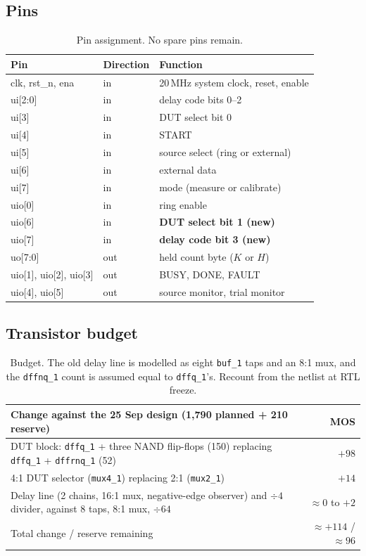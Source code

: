 \documentclass[11pt]{article}
\begin{document}
\subsection{Pins}
\begin{table}[H]
\centering\small
\begin{tabular}{@{}lll@{}}
\toprule
Pin & Direction & Function \\
\midrule
clk, rst\_n, ena & in & 20\,MHz system clock, reset, enable \\
ui[2:0] & in & delay code bits 0--2 \\
ui[3] & in & DUT select bit 0 \\
ui[4] & in & START \\
ui[5] & in & source select (ring or external) \\
ui[6] & in & external data \\
ui[7] & in & mode (measure or calibrate) \\
uio[0] & in & ring enable \\
uio[6] & in & \textbf{DUT select bit 1 (new)} \\
uio[7] & in & \textbf{delay code bit 3 (new)} \\
uo[7:0] & out & held count byte ($K$ or $H$) \\
uio[1], uio[2], uio[3] & out & BUSY, DONE, FAULT \\
uio[4], uio[5] & out & source monitor, trial monitor \\
\bottomrule
\end{tabular}
\caption{Pin assignment. No spare pins remain.}
\end{table}

\subsection{Transistor budget}
\begin{table}[H]
\centering\small
\begin{tabularx}{\linewidth}{@{}Xr@{}}
\toprule
Change against the 25 Sep design (1{,}790 planned + 210 reserve) & MOS \\
\midrule
DUT block: \texttt{dffq\_1} + three NAND flip-flops (150) replacing \texttt{dffq\_1} + \texttt{dffrnq\_1} (52) & $+98$ \\
4:1 DUT selector (\texttt{mux4\_1}) replacing 2:1 (\texttt{mux2\_1}) & $+14$ \\
Delay line (2 chains, 16:1 mux, negative-edge observer) and $\div4$ divider, against 8 taps, 8:1 mux, $\div64$ & $\approx 0$ to $+2$ \\
\midrule
Total change / reserve remaining & $\approx+114$ / $\approx96$ \\
\bottomrule
\end{tabularx}
\caption{Budget. The old delay line is modelled as eight \texttt{buf\_1} taps and an 8:1 mux, and the
\texttt{dffnq\_1} count is assumed equal to \texttt{dffq\_1}'s. Recount from the netlist at RTL freeze.}
\end{table}
\end{document}
